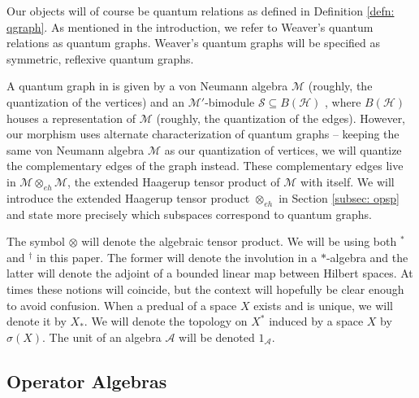\documentclass[12pt]{article}
\theoremstyle{definition}
\newcommand{\mc}[1]{\mathcal{#1}}
\newcommand{\<}{\langle}
\renewcommand{\>}{\rangle}
\renewcommand{\subset}{\subseteq}
\newcommand{\eh}{\otimes_{eh}}
\begin{document}
Our objects will of course be quantum relations as defined in Definition \ref{defn: qgraph}. As mentioned in the introduction, we refer to Weaver's quantum relations as quantum graphs. Weaver's quantum graphs will be specified as symmetric, reflexive quantum graphs.

A quantum graph in \cite{weaverqrelations} is given by a von Neumann algebra $\mc M$ (roughly, the quantization of the vertices) and an $\mc M'$-bimodule $\mc S \subset B(\mc H)$ , where $B(\mc H)$ houses a representation of $\mc M$ (roughly, the quantization of the edges). However, our morphism uses alternate characterization of quantum graphs -- keeping the same von Neumann algebra $\mc M$ as our quantization of vertices, we will quantize the complementary edges of the graph instead. These complementary edges live in $\mc M \eh \mc M$, the extended Haagerup tensor product of $\mc M$ with itself. We will introduce the extended Haagerup tensor product $\otimes_{eh}$ in Section \ref{subsec: opsp} and state more precisely which subspaces correspond to quantum graphs. 

The symbol $\otimes$ will denote the algebraic tensor product. We will be using both $^*$ and $^\dagger$ in this paper. The former will denote the involution in a $*$-algebra and the latter will denote the adjoint of a bounded linear map between Hilbert spaces. At times these notions will coincide, but the context will hopefully be clear enough to avoid confusion. When a predual of a space $X$ exists and is unique, we will denote it by $X_*$. We will denote the topology on $X^*$ induced by a space $X$ by $\sigma(X)$. The unit of an algebra $\mc A$ will be denoted $1_{\mc A}$.

\subsection{Operator Algebras} \label{prelim: op alg}
\end{document}
